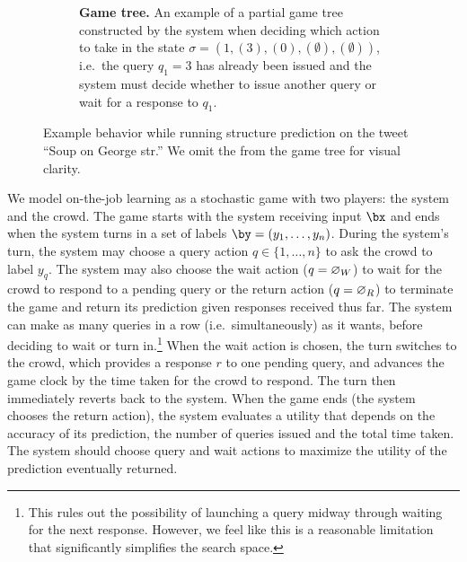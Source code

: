 \begin{figure}
\begin{centering}
\begin{subfigure}[b]{0.38\textwidth}
      \caption{
      {\bf Game tree.} An example of a partial game tree constructed by the system when deciding which action to take in the state $\sigma = (1, (3), (0), (\emptyset), (\emptyset))$, i.e.\ the query $q_1 = 3$ has already been issued and the system must decide whether to issue another query or wait for a response to $q_1$.
      }
\label{fig:tree}
    \end{subfigure}
  \end{centering}
\caption{Example behavior while running structure prediction on the tweet ``Soup on George str.''
We omit the \scres{} from the game tree for visual clarity.
}
\label{fig:game-tree}
\end{figure}




We model on-the-job learning as a stochastic game with two players: the system and the crowd.
The game starts with the system receiving input $\bx$ and ends when the system turns in a set of labels $\by = (y_1, \ldots, y_n)$. 
During the system's turn, the system may choose a query action $q \in \{1, \ldots, n\}$ to ask the crowd to label $y_q$. 
The system may also choose 
the wait action ($q = \varnothing_{W}$) to wait for the crowd to respond to a pending query
or
the return action ($q = \varnothing_{R}$) to terminate the game and return its prediction given responses received thus far.
The system can make as many queries in a row (i.e.\ simultaneously) as it wants, before deciding to wait or turn in.\footnote{
This rules out the possibility
of launching a query midway through waiting for the next response. However, we
feel like this is a reasonable limitation that significantly simplifies the
search space.
}
When the wait action is chosen, the turn switches to the crowd, which provides a response $r$ to one pending query, and advances the game clock by the time taken for the crowd to respond.
The turn then immediately reverts back to the system.
When the game ends (the system chooses the return action), the system evaluates a utility that depends on the accuracy of its prediction,
the number of queries issued and the total time taken.
The system should choose query and wait actions to
maximize the utility of the prediction eventually returned.


